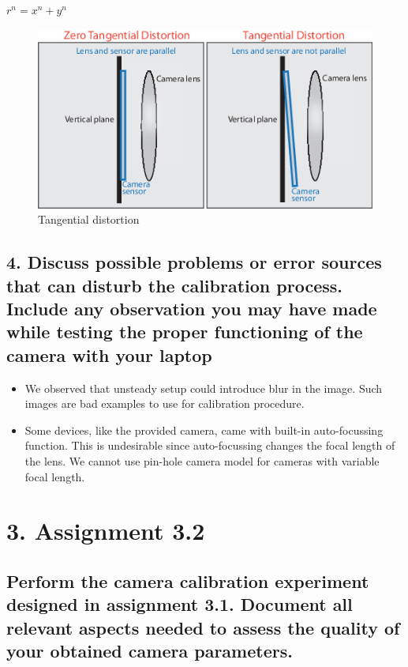 $r^n = x^n + y^n$

\begin{figure}[H]
	\centering
	\includegraphics[width=0.5\linewidth]{graphics/calibration_tangentialdistortion}
	\caption{Tangential distortion}
	\label{fig:calibrationtangentialdistortion}
\end{figure}


\subsection*{4. Discuss possible problems or error sources that can disturb the calibration process. Include any observation you may have made while testing the proper functioning of the camera with your laptop}
\begin{itemize}
\item We observed that unsteady setup could introduce blur in the image. Such images are bad examples to use for calibration procedure.
\item Some devices, like the provided camera, came with built-in auto-focussing function. This is undesirable since auto-focussing changes the focal length of the lens. We cannot use pin-hole camera model for cameras with variable focal length.
\end{itemize}



\section*{3. Assignment 3.2}
\subsection*{Perform the camera calibration experiment designed in assignment 3.1. Document all relevant aspects needed to assess the quality of your obtained camera parameters.}

	

